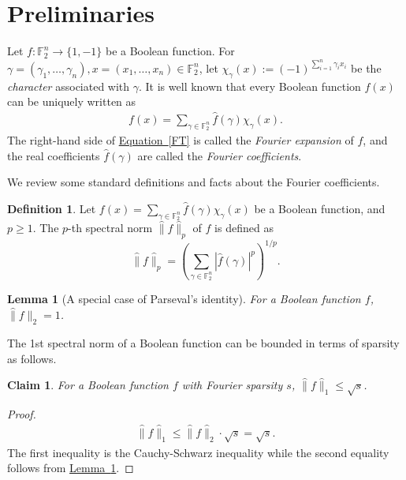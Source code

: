 \documentclass[11pt]{article}
\numberwithin{equation}{section}
\newtheorem{lemma}[theorem]{Lemma}
\theoremstyle{definition}
\newtheorem{definition}[theorem]{Definition}
\theoremstyle{plain}
\newcommand{\expeqref}[2]{\hyperref[#2]{#1~\eqref{#2}}}
\newcommand{\lref}[2][]{\hyperref[#2]{#1~\ref*{#2}}}
\newcommand{\F}{{\mathbb F}}
\newtheorem{clm}[theorem]{Claim}
\begin{document}
\section{Preliminaries}\label{sec:prelim}

Let $f:\F_2^n \rightarrow \{1,-1\}$ be a Boolean function. For $\gamma=(\gamma_1, \ldots, \gamma_n) , x=(x_1, \ldots, x_n) \in \F_2^n$, let $\chi_\gamma(x):=(-1)^{\sum_{i=1}^n \gamma_ix_i}$ be the \emph{character} associated with $\gamma$. It is well known that
every Boolean function $f(x)$
can be uniquely written as
\begin{align}f(x)=\sum_{\gamma \in \mathbb{F}_2^n}\widehat{f}(\gamma) \chi_\gamma(x).\label{FT}\end{align}
The right-hand side of \expeqref{Equation}{FT} is called the \emph{Fourier expansion} of $f$, and the real coefficients $\widehat{f}(\gamma)$ are called the \emph{Fourier coefficients}.

We review some standard definitions and facts about the Fourier
coefficients.
\begin{definition}
Let $f(x)=\sum_{\gamma \in \mathbb{F}_2^n}\widehat{f}(\gamma) \chi_\gamma(x)$ be a Boolean function, and $p \geq 1$. The $p$-th spectral norm $\widehat{\|}f\widehat{\|}_p$ of $f$ is defined as %
\[\widehat{\|}f\widehat{\|}_p=\left(\sum_{\gamma \in \mathbb{F}_2^n} \left|\widehat{f}(\gamma)\right|^p\right)^{1/p}.\]

\end{definition}

\begin{lemma}[A special case of Parseval's identity]
\label{parse}
 For a Boolean function $f$, $\widehat{\|}f\widehat{\|}_2 = 1$.
\end{lemma}
The 1st spectral norm of a Boolean function can be bounded in terms of sparsity as follows.
\begin{clm}
\label{claim:lonespar}
For a Boolean function $f$ with Fourier sparsity $s$, $\widehat{\|}f\widehat{\|}_1 \leq \sqrt{s}$.
\end{clm}
\begin{proof}
\begin{align*}
\widehat{\|}f\widehat{\|}_1  \leq \widehat{\|}f\widehat{\|}_2 \cdot \sqrt{s}   = \sqrt{s}.
\end{align*}
The first inequality is the Cauchy-Schwarz inequality while the
second equality follows from \lref[Lemma]{parse}.
\end{proof}
\end{document}
